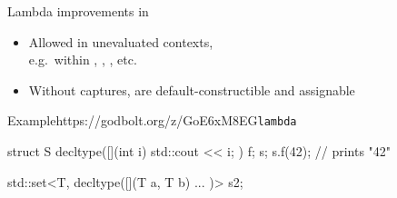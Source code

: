 \begin{advanced}
\begin{frame}[fragile]
  \begin{block}{Lambda improvements in }
    \begin{itemize}
      \item Allowed in unevaluated contexts,\\
            e.g.\ within , , , etc.
      \item Without captures, are default-constructible and assignable
    \end{itemize}
  \end{block}
  \begin{exampleblockGB}{Example}{https://godbolt.org/z/GoE6xM8EG}{\texttt{lambda }}
    \small
    \begin{cppcode*}{}
      struct S {
        decltype([](int i) { std::cout << i; }) f;
      } s;
      s.f(42); // prints "42"

      std::set<T, decltype([](T a, T b) { ... })> s2;
    \end{cppcode*}
  \end{exampleblockGB}

\end{frame}

\end{advanced}
